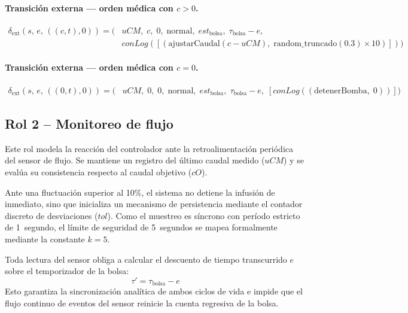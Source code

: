 \documentclass{article}
\begin{document}
\paragraph{Transición externa — orden médica con $c > 0$.}
\begin{align*}
  \delta_{\mathrm{ext}}(s,\,e,\,((c,t),0))
  = \bigl(&uCM,\;c,\;0,\;\mathrm{normal},\;est_{\mathrm{bolsa}},\;
           \tau_{\mathrm{bolsa}}-e, \\
          &conLog([(\mathrm{ajustarCaudal}(c - uCM),\;
             \mathrm{random\_truncado}(0.3) \times 10)])\bigr)
\end{align*}

\paragraph{Transición externa — orden médica con $c = 0$.}
\begin{align*}
  \delta_{\mathrm{ext}}(s,\,e,\,((0,t),0))
  = \bigl(&uCM,\;0,\;0,\;\mathrm{normal},\;est_{\mathrm{bolsa}},\;
           \tau_{\mathrm{bolsa}}-e,\;
           [conLog((\mathrm{detenerBomba},\;0))]\bigr)
\end{align*}

\subsection{Rol 2 – Monitoreo de flujo}

Este rol modela la reacción del controlador ante la retroalimentación periódica
del sensor de flujo. Se mantiene un registro del último caudal medido ($uCM$) y
se evalúa su consistencia respecto al caudal objetivo ($cO$).

Ante una fluctuación superior al 10\%, el sistema no detiene la infusión de
inmediato, sino que inicializa un mecanismo de persistencia mediante el contador
discreto de desviaciones ($tol$). Como el muestreo es síncrono con período
estricto de 1~segundo, el límite de seguridad de 5~segundos se mapea
formalmente mediante la constante $k = 5$.

Toda lectura del sensor obliga a calcular el descuento de tiempo transcurrido $e$
sobre el temporizador de la bolsa:
\[
  \tau' = \tau_{\mathrm{bolsa}} - e
\]
Esto garantiza la sincronización analítica de ambos ciclos de vida e impide que
el flujo continuo de eventos del sensor reinicie la cuenta regresiva de la bolsa.
\end{document}
